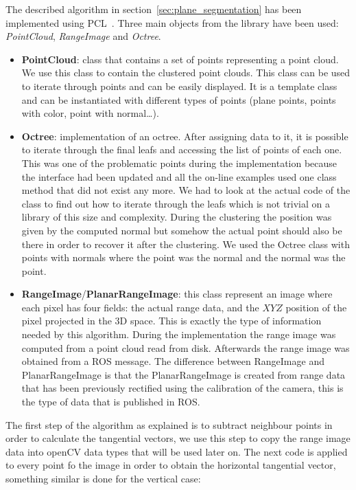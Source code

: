 \documentclass[fontsize=12pt]{article}
\begin{document}
The described algorithm in section~\ref{sec:plane_segmentation} has been implemented using PCL~\cite{bib:pcl}. Three main objects from the library have been used: \textit{PointCloud}, \textit{RangeImage} and \textit{Octree}.\\

\begin{itemize}
    \item \textbf{PointCloud}: class that contains a set of points representing a point cloud. We use this class to contain the clustered point clouds. This class can be used to iterate through points and can be easily displayed. It is a template class and can be instantiated with different types of points (plane points, points with color, point with normal\ldots).
    \item \textbf{Octree}: implementation of an octree. After assigning data to it, it is possible to iterate through the final leafs and accessing the list of points of each  one. This was one of the problematic points during the implementation because the interface had been updated and all the on-line examples used one class method that did not exist any more. We had to look at the actual code of the class to find out how to iterate through the leafs which is not trivial on a library of this size and complexity. During the clustering the position was given by the computed normal but somehow the actual point should also be there in order to recover it after the clustering. We used the Octree class with points with normals where the point was the normal and the normal was the point.
    \item \textbf{RangeImage}/\textbf{PlanarRangeImage}: this class represent an image where each pixel has four fields: the actual range data, and the $XYZ$ position of the pixel projected in the 3D space. This is exactly  the type of information needed by this algorithm. During the implementation the range image was computed from a point cloud read from disk. Afterwards the range image was obtained from a ROS message. The difference between RangeImage and PlanarRangeImage is that the PlanarRangeImage is created from range data that has been previously rectified using the calibration of the camera, this is the type of data that is published in ROS.
\end{itemize}

The first step of the algorithm as explained is to subtract neighbour points in order to calculate the tangential vectors, we use this step to copy the range image data into openCV data types that will be used later on. The next code is applied to every point fo the image in order to obtain the horizontal tangential vector, something similar is done for the vertical case:\\
\end{document}
